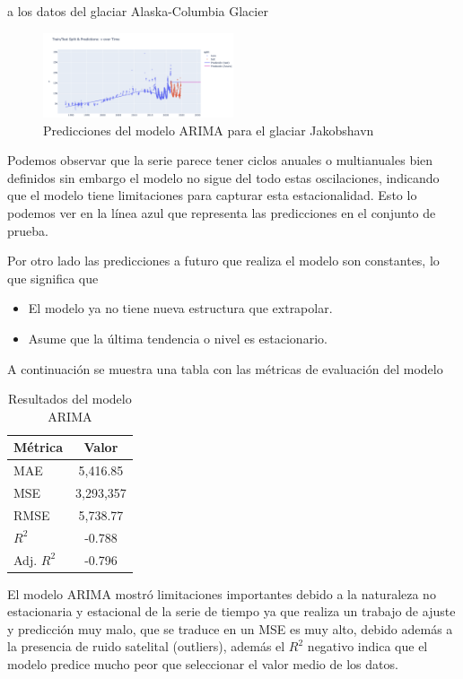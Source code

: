 \documentclass[sigconf,authordraft,language=spanish]{acmart}
\begin{document}
a los datos del glaciar Alaska-Columbia Glacier

\begin{figure}[H]
    \centering
    \includegraphics[width=0.5\textwidth]{ARIMA1.png} %
    \caption{Predicciones del modelo ARIMA para el glaciar Jakobshavn}
    \label{fig:ARIMA1}
\end{figure}

Podemos observar que la serie parece tener ciclos anuales o multianuales bien definidos sin embargo el modelo
no sigue del todo estas oscilaciones, indicando que el modelo tiene limitaciones para capturar esta estacionalidad. 
Esto lo podemos ver en la línea azul que representa las predicciones en el conjunto de prueba.

Por otro lado las predicciones a futuro que realiza el modelo son constantes, lo que significa que 

\begin{itemize}
  \item El modelo ya no tiene nueva estructura que extrapolar.
  \item Asume que la última tendencia o nivel es estacionario.
\end{itemize}

A continuación se muestra una tabla con las métricas de evaluación del modelo

\begin{table}[H]
  \caption{Resultados del modelo ARIMA}
  \label{tab:ARIMA}
  \begin{tabular}{lc}
    \toprule
    Métrica & Valor \\
    \midrule
    MAE & 5,416.85 \\
    MSE & 3,293,357 \\
    RMSE & 5,738.77 \\
    $R^2$ & -0.788 \\
    Adj. $R^2$ & -0.796 \\
    \bottomrule
  \end{tabular}
\end{table}

El modelo ARIMA mostró limitaciones importantes debido a la naturaleza no estacionaria y estacional de la serie de tiempo
ya que realiza un trabajo de ajuste y predicción muy malo, que se traduce en un MSE es muy alto, debido además a la presencia de ruido satelital (outliers),
además el $R^{2}$ negativo indica que  el modelo predice mucho peor que seleccionar el valor medio de los datos.
\end{document}
